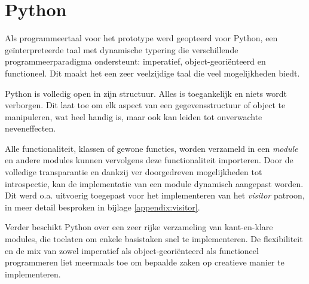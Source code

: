 
\section{Python}
\label{section:devel-python}

Als programmeertaal voor het prototype werd geopteerd voor Python, een
ge\"interpreteerde taal met dynamische typering die verschillende
programmeerparadigma ondersteunt: imperatief, object-geori\"enteerd en
functioneel. Dit maakt het een zeer veelzijdige taal die veel mogelijkheden
biedt.

Python is volledig open in zijn structuur. Alles is toegankelijk en niets wordt
verborgen. Dit laat toe om elk aspect van een gegevensstructuur of object te
manipuleren, wat heel handig is, maar ook kan leiden tot onverwachte
neveneffecten.

Alle functionaliteit, klassen of gewone functies, worden verzameld in een
\emph{module} en andere modules kunnen vervolgens deze functionaliteit
importeren. Door de volledige transparantie en dankzij ver doorgedreven
mogelijkheden tot introspectie, kan de implementatie van een module dynamisch
aangepast worden. Dit werd o.a. uitvoerig toegepast voor het implementeren van
het \emph{visitor} patroon, in meer detail besproken in bijlage
\ref{appendix:visitor}.

Verder beschikt Python over een zeer rijke verzameling van kant-en-klare
modules, die toelaten om enkele basistaken snel te implementeren. De
flexibiliteit en de mix van zowel imperatief als object-geori\"enteerd als
functioneel programmeren liet meermaals toe om bepaalde zaken op creatieve
manier te implementeren.
